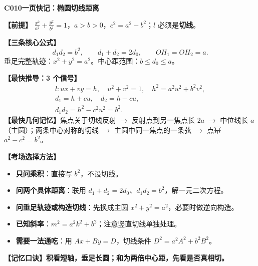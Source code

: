 \begin{summarybox}
\textbf{C010\quad 一页快记：椭圆切线距离}

\textbf{【前提】} $\frac{x^2}{a^2}+\frac{y^2}{b^2}=1$，$a>b>0$，$c^2=a^2-b^2$；$l$ 必须是\textbf{切线}。

\textbf{【三条核心公式】}
\[
\boxed{d_1d_2=b^2},\qquad
\boxed{d_1+d_2=2d_0},\qquad
\boxed{OH_1=OH_2=a}.
\]
垂足完整轨迹：$\boxed{x^2+y^2=a^2}$。中心距范围：$\boxed{b\le d_0\le a}$。

\textbf{【最快推导：3 个信号】}
\[
\begin{gathered}
l:ux+vy=h,\quad u^2+v^2=1,
\quad h^2=a^2u^2+b^2v^2,\\
d_1=h+cu,\quad d_2=h-cu,\\
\boxed{d_1d_2=h^2-c^2u^2=b^2}.
\end{gathered}
\]
\textbf{【最快几何记忆】}焦点关于切线反射 $\to$ 反射点到另一焦点长 $2a$ $\to$ 中位线长 $a$（主圆）；两条中心对称的切线 $\to$ 主圆中同一焦点的一条弦 $\to$ 点幂 $a^2-c^2=b^2$。

\textbf{【考场选择方法】}
\begin{itemize}
\item \textbf{只问乘积}：直接写 $b^2$，不设切线。
\item \textbf{问两个具体距离}：联用 $d_1+d_2=2d_0$、$d_1d_2=b^2$，解一元二次方程。
\item \textbf{问垂足轨迹或构造切线}：先换成主圆 $x^2+y^2=a^2$，必要时做逆向构造。
\item \textbf{已知斜率}：$m^2=a^2k^2+b^2$；注意竖直切线单独处理。
\item \textbf{需要一法通吃}：用 $Ax+By=D$，切线条件 $D^2=a^2A^2+b^2B^2$。
\end{itemize}

\textbf{【记忆口诀】}\quad\textbf{积看短轴，垂足长圆；和为两倍中心距，先看是否真相切。}
\end{summarybox}
